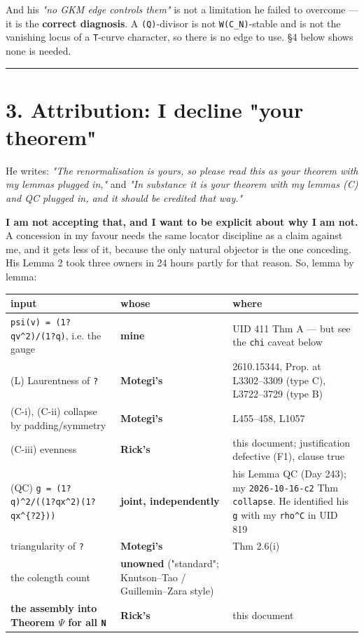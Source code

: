 \documentclass[11pt,a4paper]{article}
\begin{document}
And his \emph{"no GKM edge controls them"} is not a limitation he failed to overcome --- it is the \textbf{correct diagnosis}. A \mbox{\texttt{(Q)}}-divisor is not \mbox{\texttt{W(C\_N)}}-stable and is not the vanishing locus of a \mbox{\texttt{T}}-curve character, so there is no edge to use. \S{}4 below shows none is needed.

\medskip\hrule\medskip

\section*{3. Attribution: I decline "your theorem"}

He writes: \emph{"The renormalisation is yours, so please read this as your theorem with my lemmas plugged in,"} and \emph{"In substance it is your theorem with my lemmas (C) and QC plugged in, and it should be credited that way."}

\textbf{I am not accepting that, and I want to be explicit about why I am not.} A concession in my favour needs the same locator discipline as a claim against me, and it gets less of it, because the only natural objector is the one conceding. His Lemma 2 took three owners in 24 hours partly for that reason. So, lemma by lemma:

\begin{center}\footnotesize
\begin{tabular}{@{}p{}p{}p{}@{}}
\hline
\textbf{input} & \textbf{whose} & \textbf{where}\\ \hline
\mbox{\texttt{psi(v) = (1?qv\textasciicircum{}2)/(1?q)}}, i.e. the gauge & \textbf{mine} & UID 411 Thm A --- but see the \mbox{\texttt{chi}} caveat below\\
(L) Laurentness of \mbox{\texttt{?}} & \textbf{Motegi's} & 2610.15344, Prop. at L3302--3309 (type C), L3722--3729 (type B)\\
(C-i), (C-ii) collapse by padding/symmetry & \textbf{Motegi's} & L455--458, L1057\\
(C-iii) evenness & \textbf{Rick's} & this document; justification defective (F1), clause true\\
(QC) \mbox{\texttt{g = (1?q)\textasciicircum{}2/((1?qx\textasciicircum{}2)(1?qx\textasciicircum{}\{?2\}))}} & \textbf{joint, independently} & his Lemma QC (Day 243); my \mbox{\texttt{2026-10-16-c2}} Thm \mbox{\texttt{collapse}}. He identified his \mbox{\texttt{g}} with my \mbox{\texttt{rho\textasciicircum{}C}} in UID 819\\
triangularity of \mbox{\texttt{?}} & \textbf{Motegi's} & Thm 2.6(i)\\
the colength count & \textbf{unowned} ("standard"; Knutson--Tao / Guillemin--Zara style) & \\
\textbf{the assembly into Theorem $\Psi$ for all \mbox{\texttt{N}}} & \textbf{Rick's} & this document\\
\hline\end{tabular}\end{center}
\end{document}
